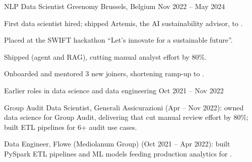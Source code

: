 \begin{cventries}
  \joborrole
    {NLP Data Scientist}
    {Greenomy}
    {Brussels, Belgium}
    {Nov 2022 -- May 2024}
    {
      \item First data scientist hired; shipped Artemis, the AI sustainability advisor, to .
      \item Placed  at the SWIFT hackathon ``Let's innovate for a sustainable future''.
      \item Shipped  (agent and RAG), cutting manual analyst effort by 80\%.
      \item Onboarded and mentored 3 new joiners, shortening ramp-up to .
    }

  \joborrole
    {Earlier roles in data science and data engineering}
    {}
    {}
    {Oct 2021 -- Nov 2022}
    {
      \item Group Audit Data Scientist, Generali Assicurazioni (Apr -- Nov 2022): owned data science for Group Audit, delivering  that cut manual review effort by 80\%; built ETL pipelines for 6+ audit use cases.
      \item Data Engineer, Flowe (Mediolanum Group) (Oct 2021 -- Apr 2022): built PySpark ETL pipelines and ML models feeding production analytics for .
    }

\end{cventries}
